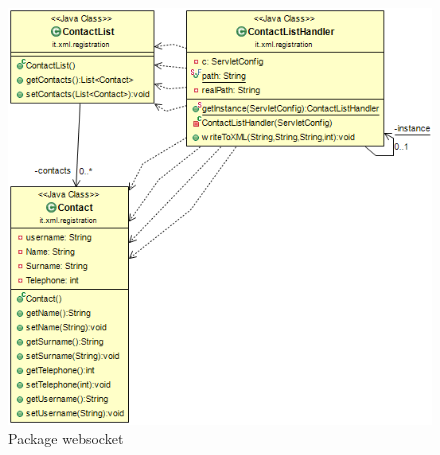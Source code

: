\begin{figure}[!htbp]
	\centering
	\includegraphics[scale = .5]{img/dependencies_xmlregistration}
	\caption{Package websocket}
	\label{gfx:dependencies_xmlregistration}
\end{figure}